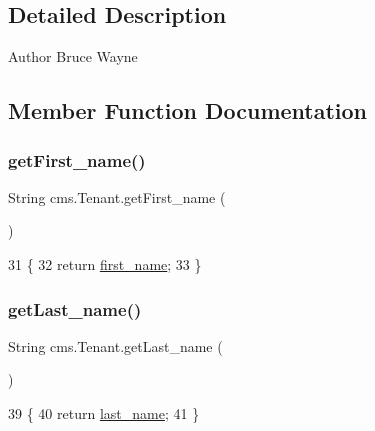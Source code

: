 \subsection{Detailed Description}
\begin{DoxyAuthor}{Author}
Bruce Wayne 
\end{DoxyAuthor}


\subsection{Member Function Documentation}
\mbox{\label{classcms_1_1_tenant_a8943f72cc08bc00df16f2853c511a119}} 
\subsubsection{\texorpdfstring{get\+First\+\_\+name()}{getFirst\_name()}}
{\footnotesize\ttfamily String cms.\+Tenant.\+get\+First\+\_\+name (\begin{DoxyParamCaption}{ }\end{DoxyParamCaption})\hspace{0.3cm}{\ttfamily [inline]}}


\begin{DoxyCode}
31                                   \{
32         \textcolor{keywordflow}{return} \mbox{\hyperlink{classcms_1_1_tenant_adba73a34c1f9da8843218c5eb247bf65}{first\_name}};
33     \}
\end{DoxyCode}
\mbox{\label{classcms_1_1_tenant_aad46ca5732d9f16cd5f84080e152ef97}} 
\subsubsection{\texorpdfstring{get\+Last\+\_\+name()}{getLast\_name()}}
{\footnotesize\ttfamily String cms.\+Tenant.\+get\+Last\+\_\+name (\begin{DoxyParamCaption}{ }\end{DoxyParamCaption})\hspace{0.3cm}{\ttfamily [inline]}}


\begin{DoxyCode}
39                                  \{
40         \textcolor{keywordflow}{return} \mbox{\hyperlink{classcms_1_1_tenant_a1f1a39984c6ad7060da79bd6a3ab91ef}{last\_name}};
41     \}
\end{DoxyCode}
\mbox{\label{classcms_1_1_tenant_ab01874700cb95a5b7c26613a83edc3fd}} 
